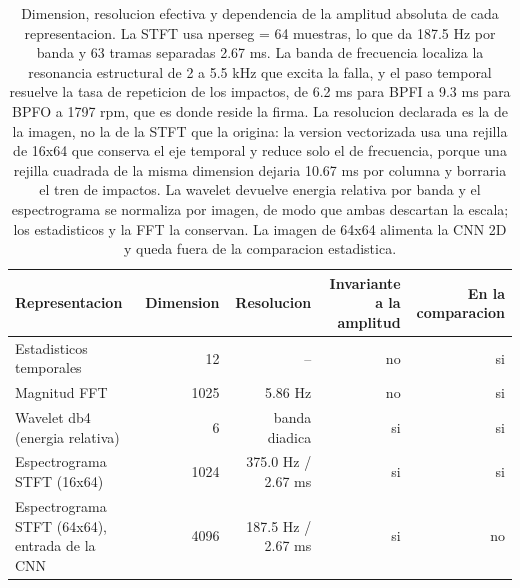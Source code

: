 \begin{table}[htbp]
\centering
\caption{Dimension, resolucion efectiva y dependencia de la amplitud absoluta de cada representacion. La STFT usa nperseg = 64 muestras, lo que da 187.5 Hz por banda y 63 tramas separadas 2.67 ms. La banda de frecuencia localiza la resonancia estructural de 2 a 5.5 kHz que excita la falla, y el paso temporal resuelve la tasa de repeticion de los impactos, de 6.2 ms para BPFI a 9.3 ms para BPFO a 1797 rpm, que es donde reside la firma. La resolucion declarada es la de la imagen, no la de la STFT que la origina: la version vectorizada usa una rejilla de 16x64 que conserva el eje temporal y reduce solo el de frecuencia, porque una rejilla cuadrada de la misma dimension dejaria 10.67 ms por columna y borraria el tren de impactos. La wavelet devuelve energia relativa por banda y el espectrograma se normaliza por imagen, de modo que ambas descartan la escala; los estadisticos y la FFT la conservan. La imagen de 64x64 alimenta la CNN 2D y queda fuera de la comparacion estadistica.}
\label{tab:representaciones}
\begin{tabular}{lrrrr}
\toprule
Representacion & Dimension & Resolucion & Invariante a la amplitud & En la comparacion \\
\midrule
Estadisticos temporales & 12 & -- & no & si \\
Magnitud FFT & 1025 & 5.86 Hz & no & si \\
Wavelet db4 (energia relativa) & 6 & banda diadica & si & si \\
Espectrograma STFT (16x64) & 1024 & 375.0 Hz / 2.67 ms & si & si \\
Espectrograma STFT (64x64), entrada de la CNN & 4096 & 187.5 Hz / 2.67 ms & si & no \\
\bottomrule
\end{tabular}
\end{table}
